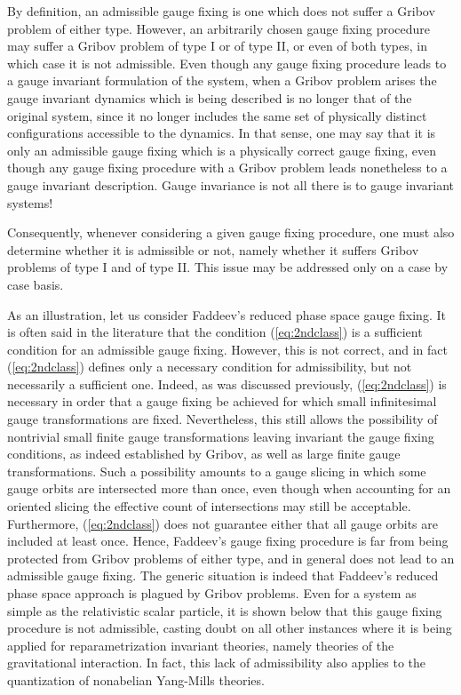 \documentclass[a4paper,11pt]{article}
\begin{document}
By definition, an admissible gauge fixing is one which does not suffer
a Gribov problem of either type. However, an arbitrarily chosen gauge 
fixing procedure may suffer a Gribov problem of type I or of type II,
or even of both types, in which case it is not admissible. Even though
any gauge fixing procedure leads to a gauge invariant formulation of the
system, when a Gribov problem arises the gauge invariant dynamics which is 
being described is no longer that of the original system, since it no longer
includes the same set of physically distinct configurations accessible
to the dynamics. In that sense, one may say that it is only an admissible
gauge fixing which is a physically correct gauge fixing, even though
any gauge fixing procedure with a Gribov problem leads nonetheless
to a gauge invariant description. Gauge invariance is not all there is
to gauge invariant systems!

Consequently, whenever considering a given gauge fixing procedure,
one must also determine whether it is admissible or not, namely
whether it suffers Gribov problems of type I and of type II. This issue
may be addressed only on a case by case basis.

As an illustration, let us consider Faddeev's reduced phase space gauge
fixing. It is often said in the literature that the condition 
(\ref{eq:2ndclass}) is a sufficient condition for an admissible gauge
fixing. However, this is not correct, and in fact (\ref{eq:2ndclass})
defines only a necessary condition for admissibility, but not 
necessarily a sufficient one. Indeed, as was discussed previously, 
(\ref{eq:2ndclass}) is necessary in order that a gauge fixing be achieved 
for which small infinitesimal gauge transformations are fixed. Nevertheless, 
this still allows the possibility of nontrivial small finite gauge 
transformations
leaving invariant the gauge fi\-xing conditions, as indeed established
by Gribov,\cite{Gribov} as well as large finite gauge transformations. 
Such a possibility amounts to a gauge slicing in which some
gauge orbits are intersected more than once, even though when accounting
for an oriented slicing the effective count of intersections may still be
acceptable.\cite{Gribov2} Furthermore, (\ref{eq:2ndclass}) does not 
guarantee either that all gauge orbits are included at least once. 
Hence, Faddeev's gauge fixing procedure is far from being protected from 
Gribov problems of either type, and in general does not lead to an 
admissible gauge fixing. The generic situation is indeed that Faddeev's 
reduced phase space approach is plagued by Gribov problems.\cite{JG1,JG4,JG5} 
Even for a system as simple as the relativistic
scalar particle, it is shown below that this gauge fixing procedure is
not admissible, casting doubt on all other instances where it is being
applied for reparametrization invariant theories, namely theories of the
gravitational interaction. In fact, this lack of admissibility also
applies to the quantization of nonabelian Yang-Mills theories.\cite{Gribov}
\end{document}
